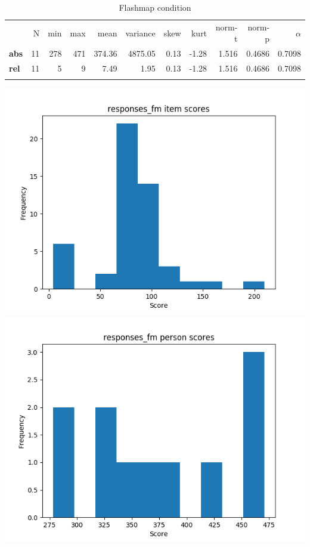 \begin{longtable}[c]{@{}lrrrrrrrrrr@{}}
\caption{Flashmap condition}
\endfirsthead
\toprule\addlinespace
& N & min & max & mean & variance & skew & kurt & norm-t &
norm-p & $\alpha$
\\\addlinespace
\midrule
\textbf{abs} & 11 & 278 & 471 & 374.36 & 4875.05 & 0.13 & -1.28 & 1.516
& 0.4686 & 0.7098
\\\addlinespace
\textbf{rel} & 11 & 5 & 9 & 7.49 & 1.95 & 0.13 & -1.28 & 1.516 & 0.4686
& 0.7098
\\\addlinespace
\bottomrule
\end{longtable}

\includegraphics{img/responses_fm_diff.png}
\includegraphics{img/responses_fm_abil.png}

